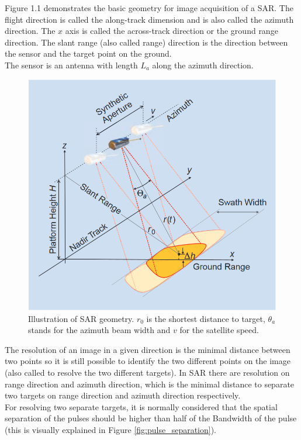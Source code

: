 Figure 1.1 demonstrates the basic geometry for image acquisition of a SAR. The flight direction is called the along-track dimension and is also called the azimuth direction. The $x$ axis is called the across-track direction or the ground range direction. The slant range (also called range) direction is the direction between the sensor and the target point on the ground.\\
The sensor is an antenna with length $L_a$ along the azimuth direction.

\begin{figure}[H]
    \centering
    \includegraphics[width=0.8\linewidth]{Cap1/geometry.png}
    \caption{Illustration of SAR geometry. $r_0$ is the shortest distance to target, $\theta_a$ stands for the azimuth beam width and $v$ for the satellite speed. \cite{tutorial}}
    \label{fig:SAR_geometry}
\end{figure}{}

The resolution of an image in a given direction is the minimal distance between two points so it is still possible to identify the two different points on the image (also called to resolve the two different targets). In SAR there are resolution on range direction and azimuth direction, which is the minimal distance to separate two targets on range direction and azimuth direction respectively.\\
For resolving two separate targets, it is normally considered that the spatial separation of the pulses should be higher than half of the Bandwidth of the pulse (this is visually explained in Figure \ref{fig:pulse_separation}).

